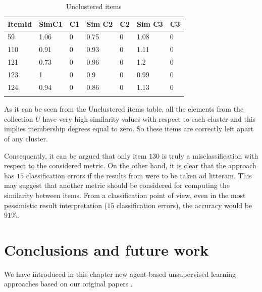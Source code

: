\begin{table}[h!]
\begin{tabular}{lllllll}
\cline{1-7}
ItemId & SimC1 & C1 & Sim C2 & C2 & Sim C3 & C3\\ 
\hline
59 & 1.06 & 0 & 0.75 & 0 & 1.08 & 0\\
110 & 0.91 & 0 & 0.93 & 0 & 1.11 & 0\\
121 & 0.73 & 0 & 0.96 & 0 & 1.2 & 0\\
123 & 1 & 0 & 0.9 & 0 & 0.99 & 0\\
124 & 0.94 & 0 & 0.86 & 0 & 1.13 & 0\\
\hline \\
\end{tabular} 
\caption{Unclustered items}
\label{tab:unclustered}
\end{table}

As it can be seen from the Unclustered items table, all the elements from the collection $U$ have very high similarity values with respect to each cluster and this implies membership degrees equal to zero. So these items are correctly left apart of any cluster. 

Consequently, it can be argued that only item $130$ is truly a misclassification with respect to the considered metric. On the other hand, it is clear that the approach has $15$ classification errors if the results from \cite{website:wine} were to be taken ad litteram. This may suggest that another metric should be considered for computing the similarity between items. From a classification point of view, even in the most pessimistic result interpretation ($15$ classification errors), the accuracy would be $91\%$.


\section{Conclusions and future work}
\label{sec:clustconclusionsfw}

We have introduced in this chapter new agent-based unsupervised learning approaches based on our original papers \cite{Gaceanu10AnAdaptive,  Gaceanu11AContext, Gaceanu11AFuzzy, Gaceanu11ABio, Gaceanu11AnIncremental}. 

